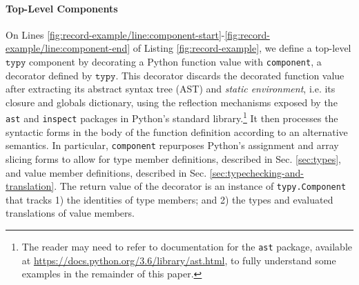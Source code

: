 \documentclass[preprint,10pt]{sigplanconf}
\newcommand{\typy}{\texttt{typy}}
\newcommand{\lip}[1]{\lstinline[language=Python,basicstyle=\ttfamily\footnotesize,deletendkeywords={tuple,buffer,map}]{#1}}
\begin{document}
\paragraph{Top-Level Components}
On Lines \ref{fig:record-example/line:component-start}-\ref{fig:record-example/line:component-end} of Listing \ref{fig:record-example}, we define a top-level $\typy$ component by decorating a Python function value with \lip{component}, a decorator defined by $\typy$. 
This decorator discards the decorated function value  after extracting its abstract syntax tree (AST) and \emph{static environment}, i.e. its closure and globals dictionary, using the reflection mechanisms exposed by the \lip{ast} and \lip{inspect}  packages in Python's standard library.\footnote{The reader may need to refer to  documentation for the \lip{ast} package, available at \url{https://docs.python.org/3.6/library/ast.html}, to fully understand some examples in the remainder of this paper.} It then processes the syntactic forms in the body of the function definition according to an alternative semantics. In particular, \lip{component} repurposes Python's assignment and array slicing forms to allow for type member definitions, described in Sec. \ref{sec:types}, and value member definitions, described in Sec. \ref{sec:typechecking-and-translation}. The return value of the decorator is an instance of \lip{typy.Component} that tracks 1) the identities of type members; and 2) the types and evaluated translations of value members.%

%


\end{document}
